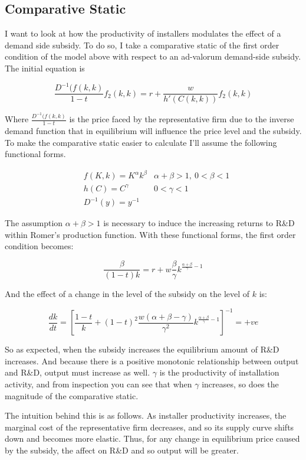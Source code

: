 \documentclass{article}
\begin{document}
\subsection{Comparative Static}

I want to look at how the productivity of installers modulates the effect of a demand side subsidy. To do so, I take a comparative static of the first order condition of the model above with respect to an ad-valorum demand-side subsidy. The initial equation is

\[
\frac{D^{-1}(f(k,k)}{1-t} f_2(k,k) = r + \frac{w}{h'(C(k,k))} f_2 (k,k)
\]

Where $\frac{D^{-1}(f(k,k)}{1-t}$ is the price faced by the representative firm due to the inverse demand function that in equilibrium will influence the price level and the subsidy. To make the comparative static easier to calculate I'll assume the following functional forms.

\begin{align*}
&f(K,k) = K^\alpha k^\beta & \alpha+\beta >1, ~ 0<\beta<1 \\
&h(C) = C^\gamma & 0 < \gamma < 1 \\
&D^{-1} (y) = y^{-1}
\end{align*}

The assumption $\alpha+\beta >1$ is necessary to induce the increasing returns to R\&D within Romer's production function. With these functional forms, the first order condition becomes: 

\[
\frac{\beta}{(1-t)k} = r + w \frac{\beta}{\gamma} k^{\frac{\alpha+\beta}{\gamma} - 1}
\]

And the effect of a change in the level of the subsidy on the level of $k$ is:

\begin{equation}
\frac{dk}{dt} = \left[ \frac{1-t}{k} + (1-t)^2 \frac{w (\alpha + \beta - \gamma)}{\gamma^2} k^{\frac{\alpha+\beta}{\gamma} - 1} \right]^{-1} = +ve
\label{comp_stat}
\end{equation}

So as expected, when the subsidy increases the equilibrium amount of R\&D increases. And because there is a positive monotonic relationship between output and R\&D, output must increase as well. $\gamma$ is the productivity of installation activity, and from inspection you can see that when $\gamma$ increases, so does the magnitude of the comparative static.

The intuition behind this is as follows. As installer productivity increases, the marginal cost of the representative firm decreases, and so its supply curve shifts down and becomes more elastic. Thus, for any change in equilibrium price caused by the subsidy, the affect on R\&D and so output will be greater.
\end{document}

